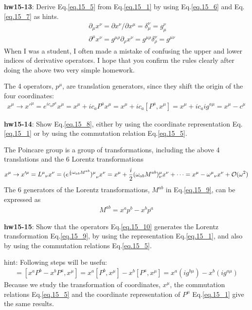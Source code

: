 \documentclass[12pt]{article}
\def\del{{\partial}}
\begin{document}
{{\bf hw15-13}: Derive Eq.\ref{eq.15_5} from Eq.\ref{eq.15_1} by using Eq.\ref{eq.15_6} and Eq.\ref{eq.15_7} as hints.
\begin{eqnarray}
  && \del_\mu x^\nu = \del x^\nu / \del x^\mu
  = \delta_\mu^\nu
  = g_\mu^\nu         \label{eq.15_6}         \\
&&\del^\mu x^\nu = g^{\mu\rho} \del_\rho x^\nu
  = g^{\mu\rho} \delta_\rho^\nu   
  = g^{\mu\nu} \label{eq.15_7}
\end{eqnarray}
  When I was a student, I often made a mistake of confusing the upper and
  lower indices of derivative operators. I hope that you confirm the
  rules clearly after doing the above two very simple homework.

  The 4 operators, $p^\mu$, are translation generators, since they shift
  the origin of the four coordinates:
\begin{eqnarray}
  x^\mu \to x'^\mu = e^{i c_a p^a} x^\mu
                    = x^\mu + i c_a  P^a  x^\mu
                    = x^\mu + i c_a [P^a, x^\mu]
                    = x^\mu + i c_a i g^{a\mu}
                    = x^\mu - c^\mu \label{eq.15_8}
\end{eqnarray}

{\bf hw15-14}: Show Eq.\ref{eq.15_8}, either by using the coordinate representation Eq.\ref{eq.15_1} or by using the commutation relation Eq.\ref{eq.15_5}.

  The Poincare group is a group of transformations, including the above
  4 translations and the 6 Lorentz transformations
\begin{eqnarray}
  x^\mu \to x'^\mu = {L^\mu}_\nu x^\nu
  = {(e^{\frac{i}{2} \omega_{ab} M^{ab}})^\mu}_\nu x^\nu
  = x^\mu +\frac{i}{2} (\omega_{ab} M^{ab})^\mu_\nu x^\nu + \cdots
  = x^\mu - {\omega^\mu}_\nu x^\nu + {\cal O}(\omega^2) \label{eq.15_9}
\end{eqnarray}
  The 6 generators of the Lorentz transformations, $M^{ab}$ in Eq.\ref{eq.15_9}, can be expressed as
  \begin{eqnarray}
    M^{ab} = x^a p^b - x^b p^a \label{eq.15_10}
  \end{eqnarray}

{\bf hw15-15}: Show that the operators Eq.\ref{eq.15_10} generates the Lorentz
  transformation Eq.\ref{eq.15_9}, by using the representation Eq.\ref{eq.15_1}, and also by using the commutation relations Eq.\ref{eq.15_5}.

  hint: Following steps will be usefu:
\begin{eqnarray}
  [M^{ab}, x^\mu] = [x^a P^b - x^b P^a, x^\mu]
                     = x^a [P^b, x^\mu] - x^b [P^a, x^\mu]
                     = x^a (i g^{b\mu}) - x^b (i g^{a\mu}) \label{eq.15_11a}
\end{eqnarray}
  Because we study the transformation of coordinates, $x^\mu$,
  the commutation relations Eq.\ref{eq.15_5} and the coordinate representation
  of $P^\mu$ Eq.\ref{eq.15_1} give the same results.

}
\end{document}
